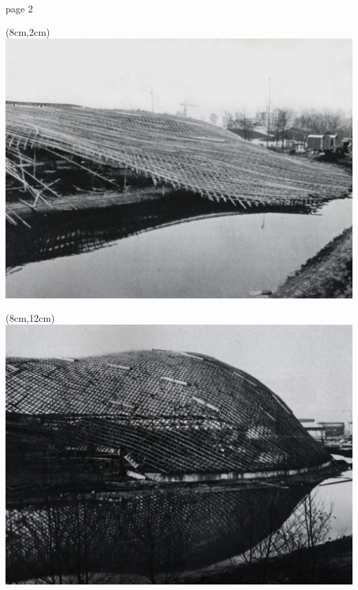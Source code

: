 \documentclass[fleqn]{thesis}
\begin{document}
	\clearpage
page 2
	\begin{textblock*}{5cm}(8cm,2cm)%
		\setlength{\parskip}{0pt}
		\includegraphics[width=.5\paperwidth]{mannheim_erection_1.jpg}
	\end{textblock*}
	\begin{textblock*}{5cm}(8cm,12cm)%
		\setlength{\parskip}{0pt}
		\includegraphics[width=.5\paperwidth]{mannheim_erection_2.jpg}
	\end{textblock*}



	\clearpage
\end{document}
